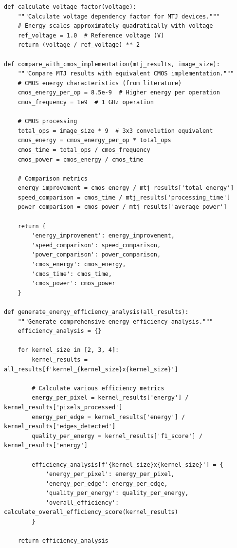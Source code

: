 \documentclass[conference]{IEEEtran}
\begin{document}
{{{{\begin{lstlisting}[caption={Comprehensive energy consumption calculation with device modeling}]
def calculate_voltage_factor(voltage):
    """Calculate voltage dependency factor for MTJ devices."""
    # Energy scales approximately quadratically with voltage
    ref_voltage = 1.0  # Reference voltage (V)
    return (voltage / ref_voltage) ** 2

def compare_with_cmos_implementation(mtj_results, image_size):
    """Compare MTJ results with equivalent CMOS implementation."""
    # CMOS energy characteristics (from literature)
    cmos_energy_per_op = 8.5e-9  # Higher energy per operation
    cmos_frequency = 1e9  # 1 GHz operation
    
    # CMOS processing
    total_ops = image_size * 9  # 3x3 convolution equivalent
    cmos_energy = cmos_energy_per_op * total_ops
    cmos_time = total_ops / cmos_frequency
    cmos_power = cmos_energy / cmos_time
    
    # Comparison metrics
    energy_improvement = cmos_energy / mtj_results['total_energy']
    speed_comparison = cmos_time / mtj_results['processing_time']
    power_comparison = cmos_power / mtj_results['average_power']
    
    return {
        'energy_improvement': energy_improvement,
        'speed_comparison': speed_comparison, 
        'power_comparison': power_comparison,
        'cmos_energy': cmos_energy,
        'cmos_time': cmos_time,
        'cmos_power': cmos_power
    }

def generate_energy_efficiency_analysis(all_results):
    """Generate comprehensive energy efficiency analysis."""
    efficiency_analysis = {}
    
    for kernel_size in [2, 3, 4]:
        kernel_results = all_results[f'kernel_{kernel_size}x{kernel_size}']
        
        # Calculate various efficiency metrics
        energy_per_pixel = kernel_results['energy'] / kernel_results['pixels_processed']
        energy_per_edge = kernel_results['energy'] / kernel_results['edges_detected']
        quality_per_energy = kernel_results['f1_score'] / kernel_results['energy']
        
        efficiency_analysis[f'{kernel_size}x{kernel_size}'] = {
            'energy_per_pixel': energy_per_pixel,
            'energy_per_edge': energy_per_edge,
            'quality_per_energy': quality_per_energy,
            'overall_efficiency': calculate_overall_efficiency_score(kernel_results)
        }
    
    return efficiency_analysis
\end{lstlisting}

}}}}
\end{document}
